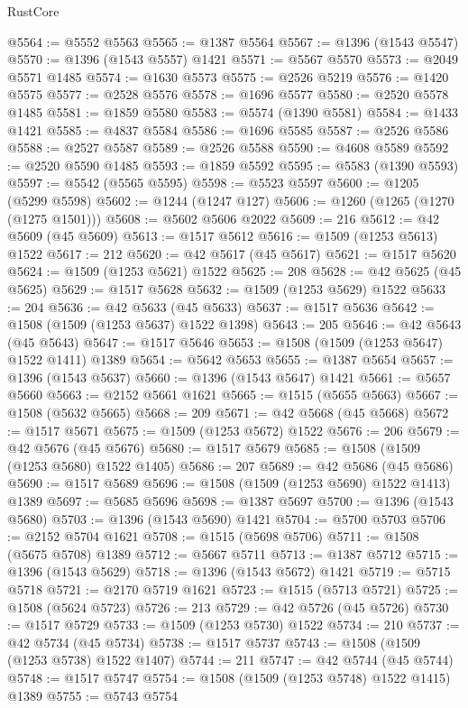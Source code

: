 \begin{lexlean}{RustCore}
\begin{coremodule}
@5564 := @5552 @5563
@5565 := @1387 @5564
@5567 := @1396 (@1543 @5547)
@5570 := @1396 (@1543 @5557) @1421
@5571 := @5567 @5570
@5573 := @2049 @5571 @1485
@5574 := @1630 @5573
@5575 := @2526 @5219
@5576 := @1420 @5575
@5577 := @2528 @5576
@5578 := @1696 @5577
@5580 := @2520 @5578 @1485
@5581 := @1859 @5580
@5583 := @5574 (@1390 @5581)
@5584 := @1433 @1421
@5585 := @4837 @5584
@5586 := @1696 @5585
@5587 := @2526 @5586
@5588 := @2527 @5587
@5589 := @2526 @5588
@5590 := @4608 @5589
@5592 := @2520 @5590 @1485
@5593 := @1859 @5592
@5595 := @5583 (@1390 @5593)
@5597 := @5542 (@5565 @5595)
@5598 := @5523 @5597
@5600 := @1205 (@5299 @5598)
@5602 := @1244 (@1247 @127)
@5606 := @1260 (@1265 (@1270 (@1275 @1501)))
@5608 := @5602 @5606 @2022
@5609 := 216
@5612 := @42 @5609 (@45 @5609)
@5613 := @1517 @5612
@5616 := @1509 (@1253 @5613) @1522
@5617 := 212
@5620 := @42 @5617 (@45 @5617)
@5621 := @1517 @5620
@5624 := @1509 (@1253 @5621) @1522
@5625 := 208
@5628 := @42 @5625 (@45 @5625)
@5629 := @1517 @5628
@5632 := @1509 (@1253 @5629) @1522
@5633 := 204
@5636 := @42 @5633 (@45 @5633)
@5637 := @1517 @5636
@5642 := @1508 (@1509 (@1253 @5637) @1522 @1398)
@5643 := 205
@5646 := @42 @5643 (@45 @5643)
@5647 := @1517 @5646
@5653 := @1508 (@1509 (@1253 @5647) @1522 @1411) @1389
@5654 := @5642 @5653
@5655 := @1387 @5654
@5657 := @1396 (@1543 @5637)
@5660 := @1396 (@1543 @5647) @1421
@5661 := @5657 @5660
@5663 := @2152 @5661 @1621
@5665 := @1515 (@5655 @5663)
@5667 := @1508 (@5632 @5665)
@5668 := 209
@5671 := @42 @5668 (@45 @5668)
@5672 := @1517 @5671
@5675 := @1509 (@1253 @5672) @1522
@5676 := 206
@5679 := @42 @5676 (@45 @5676)
@5680 := @1517 @5679
@5685 := @1508 (@1509 (@1253 @5680) @1522 @1405)
@5686 := 207
@5689 := @42 @5686 (@45 @5686)
@5690 := @1517 @5689
@5696 := @1508 (@1509 (@1253 @5690) @1522 @1413) @1389
@5697 := @5685 @5696
@5698 := @1387 @5697
@5700 := @1396 (@1543 @5680)
@5703 := @1396 (@1543 @5690) @1421
@5704 := @5700 @5703
@5706 := @2152 @5704 @1621
@5708 := @1515 (@5698 @5706)
@5711 := @1508 (@5675 @5708) @1389
@5712 := @5667 @5711
@5713 := @1387 @5712
@5715 := @1396 (@1543 @5629)
@5718 := @1396 (@1543 @5672) @1421
@5719 := @5715 @5718
@5721 := @2170 @5719 @1621
@5723 := @1515 (@5713 @5721)
@5725 := @1508 (@5624 @5723)
@5726 := 213
@5729 := @42 @5726 (@45 @5726)
@5730 := @1517 @5729
@5733 := @1509 (@1253 @5730) @1522
@5734 := 210
@5737 := @42 @5734 (@45 @5734)
@5738 := @1517 @5737
@5743 := @1508 (@1509 (@1253 @5738) @1522 @1407)
@5744 := 211
@5747 := @42 @5744 (@45 @5744)
@5748 := @1517 @5747
@5754 := @1508 (@1509 (@1253 @5748) @1522 @1415) @1389
@5755 := @5743 @5754

\end{coremodule}
\end{lexlean}
